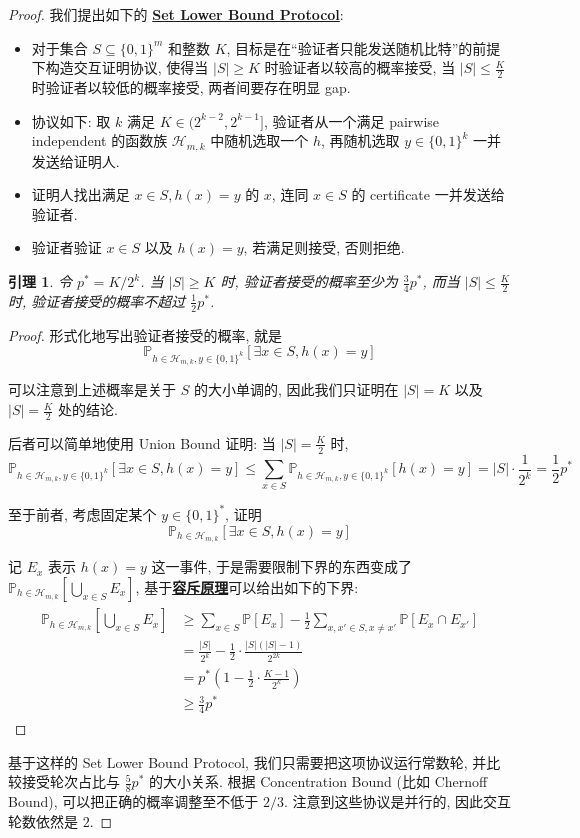 \documentclass[8pt]{article}
\theoremstyle{compact}
\newtheorem{lemma}{引理}[section]
\def\obj#1{\textbf{\uline{#1}}}
\def\le{\leqslant}
\def\ge{\geqslant}
\begin{document}
\begin{proof}
	我们提出如下的 \obj{Set Lower Bound Protocol}:
	\begin{itemize}
		\item 对于集合 $S \subseteq \{0, 1\}^m$ 和整数 $K$, 目标是在“验证者只能发送随机比特”的前提下构造交互证明协议, 使得当 $|S| \ge K$ 时验证者以较高的概率接受, 当 $|S| \le \frac{K}{2}$ 时验证者以较低的概率接受, 两者间要存在明显 gap.
	    \item 协议如下: 取 $k$ 满足 $K \in (2^{k-2}, 2^{k-1}]$, 验证者从一个满足 pairwise independent 的函数族 $\mathcal H_{m, k}$ 中随机选取一个 $h$, 再随机选取 $y \in \{0, 1\}^k$ 一并发送给证明人.
        \item 证明人找出满足 $x \in S, h(x) = y$ 的 $x$, 连同 $x \in S$ 的 certificate 一并发送给验证者.
        \item 验证者验证 $x \in S$ 以及 $h(x) = y$, 若满足则接受, 否则拒绝.
	\end{itemize}
	\begin{lemma}
		令 $p^* = K / 2^k$. 当 $|S| \ge K$ 时, 验证者接受的概率至少为 $\frac34 p^*$, 而当 $|S| \le \frac{K}{2}$ 时, 验证者接受的概率不超过 $\frac12 p^*$.
	\end{lemma}
	\begin{proof}
		形式化地写出验证者接受的概率, 就是 $$\mathbb P_{h \in \mathcal H_{m, k}, y \in \{0, 1\}^k} [\exists x \in S, h(x) = y]$$

		可以注意到上述概率是关于 $S$ 的大小单调的, 因此我们只证明在 $|S| = K$ 以及 $|S| = \frac K2$ 处的结论.
		
		后者可以简单地使用 Union Bound 证明: 当 $|S| = \frac{K}{2}$ 时,  $$\mathbb P_{h \in \mathcal H_{m, k}, y \in \{0, 1\}^k} [\exists x \in S, h(x) = y] \le \sum_{x \in S} \mathbb P_{h \in \mathcal H_{m, k}, y \in \{0, 1\}^k} [h(x) = y] = |S| \cdot \frac{1}{2^k} = \frac12 p^*$$

		至于前者, 考虑固定某个 $y \in \{0, 1\}^*$, 证明 $$\mathbb P_{h \in \mathcal H_{m, k}} [\exists x \in S, h(x) = y]$$

		记 $E_x$ 表示 $h(x) = y$ 这一事件, 于是需要限制下界的东西变成了 $\mathbb P_{h \in \mathcal H_{m, k}} \left[\bigcup_{x \in S} E_x\right]$, 基于\obj{容斥原理}可以给出如下的下界: 
		\begin{align*}
			\begin{split}
				\mathbb P_{h \in \mathcal H_{m, k}} \left[\bigcup_{x \in S} E_x\right] &\ge \sum_{x \in S}\mathbb P[E_x] - \frac12\sum_{x, x' \in S, x \neq x'}\mathbb P[E_x \cap E_{x'}] \\&= \frac{|S|}{2^k} - \frac12 \cdot \frac{|S|(|S| - 1)}{2^{2k}} \\&= p^*\left(1 - \frac12 \cdot \frac{K-1}{2^k}\right) \\&\ge \frac34 p^*
			\end{split}
		\end{align*}
	\end{proof}

	基于这样的 Set Lower Bound Protocol, 我们只需要把这项协议运行常数轮, 并比较接受轮次占比与 $\frac58 p^*$ 的大小关系. 根据 Concentration Bound (比如 Chernoff Bound), 可以把正确的概率调整至不低于 $2/3$. 注意到这些协议是并行的, 因此交互轮数依然是 $2$.
\end{proof}
\end{document}
